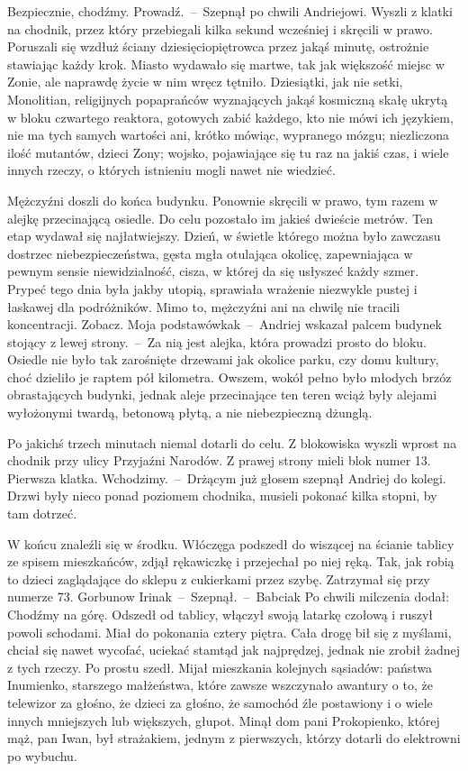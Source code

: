 \documentclass[../MAIN.tex]{subfiles}
\begin{document}
\sx
Bezpiecznie, chodźmy. Prowadź.~--~Szepnął po chwili Andriejowi.
\qd
Wyszli z klatki na chodnik, przez który przebiegali kilka sekund wcześniej i skręcili w prawo. Poruszali się wzdłuż ściany dziesięciopiętrowca przez jakąś minutę, ostrożnie stawiając każdy krok. Miasto wydawało się martwe, tak jak większość miejsc w Zonie, ale naprawdę życie w nim wręcz tętniło. Dziesiątki, jak nie setki, Monolitian, religijnych popaprańców wyznających jakąś kosmiczną skałę ukrytą w bloku czwartego reaktora, gotowych zabić każdego, kto nie mówi ich językiem, nie ma tych samych wartości ani, krótko mówiąc, wypranego mózgu; niezliczona ilość mutantów, dzieci Zony; wojsko, pojawiające się tu raz na jakiś czas, i wiele innych rzeczy, o których istnieniu mogli nawet nie wiedzieć.

Mężczyźni doszli do końca budynku. Ponownie skręcili w prawo, tym razem w alejkę przecinającą osiedle. Do celu pozostało im jakieś dwieście metrów. Ten etap wydawał się najłatwiejszy. Dzień, w świetle którego można było zawczasu dostrzec niebezpieczeństwa, gęsta mgła otulająca okolicę, zapewniająca w pewnym sensie niewidzialność, cisza, w której da się usłyszeć każdy szmer. Prypeć tego dnia była jakby utopią, sprawiała wrażenie niezwykle pustej i łaskawej dla podróżników. Mimo to, mężczyźni ani na chwilę nie tracili koncentracji.
\sx
Zobacz. Moja podstawówka\3k~--~Andriej wskazał palcem budynek stojący z lewej strony.~--~Za nią jest alejka, która prowadzi prosto do bloku.
\qd\mm
Osiedle nie było tak zarośnięte drzewami jak okolice parku, czy domu kultury, choć dzieliło je raptem pół kilometra. Owszem, wokół pełno było młodych brzóz obrastających budynki, jednak aleje przecinające ten teren wciąż były alejami wyłożonymi twardą, betonową płytą, a nie niebezpieczną dżunglą.

Po jakichś trzech minutach niemal dotarli do celu. Z blokowiska wyszli wprost na chodnik przy ulicy Przyjaźni Narodów. Z prawej strony mieli blok numer 13.
\sx
Pierwsza klatka. Wchodzimy.~--~Drżącym już głosem szepnął Andriej do kolegi.
\qm
Drzwi były nieco ponad poziomem chodnika, musieli pokonać kilka stopni, by tam dotrzeć.

W końcu znaleźli się w środku. Włóczęga podszedł do wiszącej na ścianie tablicy ze spisem mieszkańców, zdjął rękawiczkę i przejechał po niej ręką. Tak, jak robią to dzieci zaglądające do sklepu z cukierkami przez szybę. Zatrzymał się przy numerze 73.
\sx Gorbunow Irina\3k~--~Szepnął.~--~Babcia\3k \qd
 Po chwili milczenia dodał:
\sx Chodźmy na górę.
\qd
Odszedł od tablicy, włączył swoją latarkę czołową i ruszył powoli schodami. Miał do pokonania cztery piętra. Cała drogę bił się z myślami, chciał się nawet wycofać, uciekać stamtąd jak najprędzej, jednak nie zrobił żadnej z tych rzeczy. Po prostu szedł. Mijał mieszkania kolejnych sąsiadów: państwa Inumienko, starszego małżeństwa, które zawsze wszczynało awantury o to, że telewizor za głośno, że dzieci za głośno, że samochód źle postawiony i o wiele innych mniejszych lub większych, głupot. Minął dom pani Prokopienko, której mąż, pan Iwan, był strażakiem, jednym z pierwszych, którzy dotarli do elektrowni po wybuchu.
\end{document}
